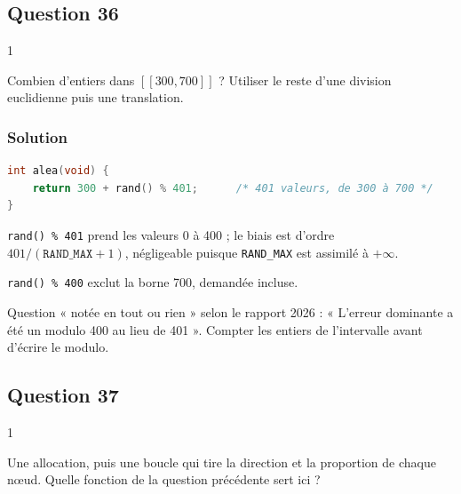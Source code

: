 \documentclass[11pt,a4paper]{article}
\begin{document}
\hypertarget{question-36}{%
\subsection{Question 36}\label{question-36}}

\begin{indication}{1}

Combien d'entiers dans \([\![300, 700]\!]\) ? Utiliser le reste d'une division euclidienne puis une translation.

\end{indication}

\hypertarget{solution-35}{%
\subsubsection{Solution}\label{solution-35}}

\begin{lstlisting}[language=C]
int alea(void) {
    return 300 + rand() % 401;      /* 401 valeurs, de 300 à 700 */
}
\end{lstlisting}

\texttt{rand()\ \%\ 401} prend les valeurs 0 à 400 ; le biais est d'ordre \(401/(\texttt{RAND\_MAX} + 1)\), négligeable puisque \texttt{RAND\_MAX} est assimilé à \(+\infty\).

\begin{piege}

\texttt{rand()\ \%\ 400} exclut la borne 700, demandée incluse.

\end{piege}

\begin{jury}

Question « notée en tout ou rien » selon le rapport 2026 : « L'erreur dominante a été un modulo 400 au lieu de 401 ». Compter les entiers de l'intervalle avant d'écrire le modulo.

\end{jury}

\hypertarget{question-37}{%
\subsection{Question 37}\label{question-37}}

\begin{indication}{1}

Une allocation, puis une boucle qui tire la direction et la proportion de chaque nœud. Quelle fonction de la question précédente sert ici ?

\end{indication}
\end{document}
